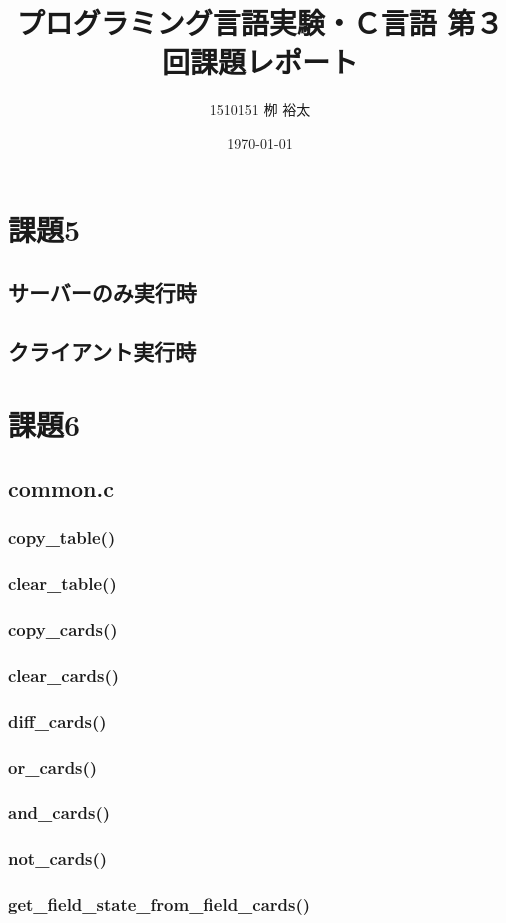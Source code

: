 \documentclass[11pt,a4paper, uplatex]{jsarticle}
\title{プログラミング言語実験・Ｃ言語 第３回課題レポート}
\author{1510151  栁 裕太}
\date{\today}
\begin{document}
\section{課題5}
%
\subsection{サーバーのみ実行時}
%
\subsection{クライアント実行時}
%
\section{課題6}
%
\subsection{common.c}
%
\subsubsection{copy\_table()}
%
\subsubsection{clear\_table()}
%
\subsubsection{copy\_cards()}
%
\subsubsection{clear\_cards()}
%
\subsubsection{diff\_cards()}
%
\subsubsection{or\_cards()}
%
\subsubsection{and\_cards()}
%
\subsubsection{not\_cards()}
%
\subsubsection{get\_field\_state\_from\_field\_cards()}
%
\end{document}
